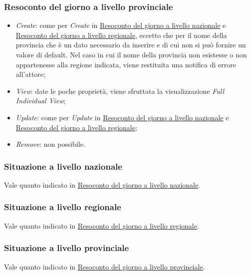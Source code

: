 \subsubsection{Resoconto del giorno a livello provinciale}
\label{sss:operazioni-resoconto-del-giorno-livello-provinciale}
\begin{itemize}
    \item \textit{Create}: come per \textit{Create} in \hyperref[sss:operazioni-resoconto-del-giorno-livello-nazionale]{Resoconto del giorno a livello nazionale} e \hyperref[sss:operazioni-resoconto-del-giorno-livello-regionale]{Resoconto del giorno a livello regionale}, eccetto che per il nome della provincia che è un dato necessario da inserire e di cui non si può fornire un valore di default.
    Nel caso in cui il nome della provincia non esistesse o non appartenesse alla regione indicata, viene restituita una notifica di errore all'attore;
    \item \textit{View}: date le poche proprietà, viene sfruttata la visualizzazione \textit{Full Individual View};
    \item \textit{Update}: come per \textit{Update} in \hyperref[sss:operazioni-resoconto-del-giorno-livello-nazionale]{Resoconto del giorno a livello nazionale} e \hyperref[sss:operazioni-resoconto-del-giorno-livello-regionale]{Resoconto del giorno a livello regionale};
    \item \textit{Remove}: non possibile.
\end{itemize}

\subsubsection{Situazione a livello nazionale}
\label{sss:operazioni-situazione-livello-nazionale}
Vale quanto indicato in \hyperref[sss:operazioni-resoconto-del-giorno-livello-nazionale]{Resoconto del giorno a livello nazionale}.

\subsubsection{Situazione a livello regionale}
\label{sss:operazioni-situazione-livello-regionale}
Vale quanto indicato in \hyperref[sss:operazioni-resoconto-del-giorno-livello-regionale]{Resoconto del giorno a livello regionale}.

\subsubsection{Situazione a livello provinciale}
\label{sss:operazioni-situazione-livello-provinciale}
Vale quanto indicato in \hyperref[sss:operazioni-resoconto-del-giorno-livello-provinciale]{Resoconto del giorno a livello provinciale}.

